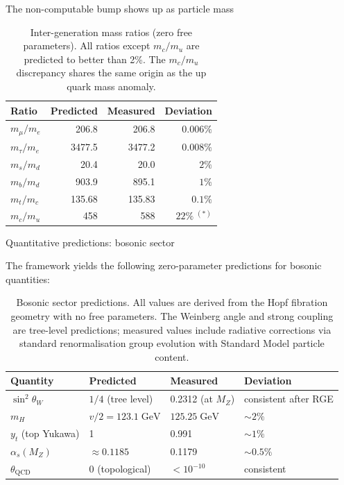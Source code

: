 \documentclass[final]{beamer}
\newlength{\colwidth}
\begin{document}
\begin{frame}[t]
\begin{columns}[t]
\begin{column}{\colwidth}
\begin{block}{The non-computable bump shows up as particle mass}
\begin{table}[t]
  \centering
  \caption{Inter-generation mass ratios (zero free parameters). All ratios except $m_c/m_u$ are predicted to better than 2\%. The $m_c/m_u$ discrepancy shares the same origin as the up quark mass anomaly.}
  \label{tab:ratios}
  \begin{tabular}{lrrr}
    \toprule
    Ratio & Predicted & Measured & Deviation \\
    \midrule
    $m_\mu / m_e$ & 206.8 & 206.8 & $0.006\%$ \\
    $m_\tau / m_e$ & 3477.5 & 3477.2 & $0.008\%$ \\[4pt]
    $m_s / m_d$ & 20.4 & 20.0 & $2\%$ \\
    $m_b / m_d$ & 903.9 & 895.1 & $1\%$ \\[4pt]
    $m_t / m_c$ & 135.68 & 135.83 & $0.1\%$ \\
    $m_c / m_u$ & 458 & 588 & $22\%\;^{(*)}$ \\
    \bottomrule
  \end{tabular}
\end{table}

\end{block}
\begin{block}{Quantitative predictions: bosonic sector}

The framework yields the following zero-parameter predictions for bosonic quantities:

\begin{table}[h]
  \centering
  \caption{Bosonic sector predictions. All values are derived from the Hopf fibration geometry with no free parameters. The Weinberg angle and strong coupling are tree-level predictions; measured values include radiative corrections via standard renormalisation group evolution with Standard Model particle content.}
  \label{tab:bosons}
  \begin{tabular}{llll}
    \toprule
    Quantity & Predicted & Measured & Deviation \\
    \midrule
    $\sin^2\!\theta_W$ & $1/4$ (tree level) & 0.2312 (at $M_Z$) & consistent after RGE \\
    $m_H$ & $v/2 = 123.1\;\mathrm{GeV}$ & $125.25\;\mathrm{GeV}$ & $\sim 2\%$ \\
    $y_t$ (top Yukawa) & 1 & 0.991 & $\sim 1\%$ \\
    $\alpha_s(M_Z)$ & $\approx 0.1185$ & 0.1179 & $\sim 0.5\%$ \\
    $\theta_{\mathrm{QCD}}$ & 0 (topological) & $< 10^{-10}$ & consistent \\
    \bottomrule
  \end{tabular}
\end{table}


\end{block}
\end{column}
\end{columns}
\end{frame}
\end{document}
